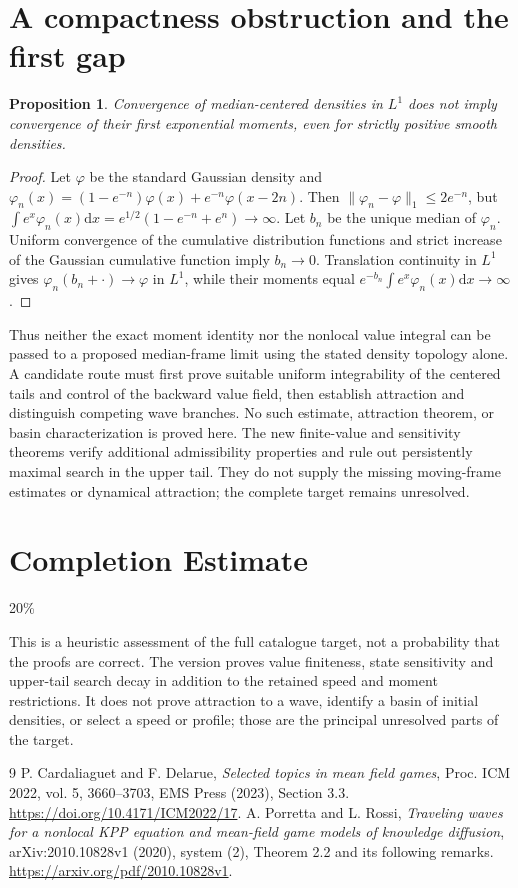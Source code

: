\documentclass[11pt]{article}
\newtheorem{proposition}[theorem]{Proposition}
\newcommand{\dd}{\mathrm d}
\begin{document}
\section{A compactness obstruction and the first gap}
\begin{proposition}
Convergence of median-centered densities in $L^1$ does not imply convergence of their first exponential moments, even for strictly positive smooth densities.
\end{proposition}
\begin{proof}
Let $\varphi$ be the standard Gaussian density and $\varphi_n(x)=(1-e^{-n})\varphi(x)+e^{-n}\varphi(x-2n)$. Then $\|\varphi_n-\varphi\|_1\le2e^{-n}$, but
$\int e^x\varphi_n(x)\dd x=e^{1/2}(1-e^{-n}+e^n)\to\infty$.
Let $b_n$ be the unique median of $\varphi_n$. Uniform convergence of the cumulative distribution functions and strict increase of the Gaussian cumulative function imply $b_n\to0$. Translation continuity in $L^1$ gives $\varphi_n(b_n+\cdot)\to\varphi$ in $L^1$, while their moments equal $e^{-b_n}\int e^x\varphi_n(x)\dd x\to\infty$.
\end{proof}
Thus neither the exact moment identity nor the nonlocal value integral can be passed to a proposed median-frame limit using the stated density topology alone. A candidate route must first prove suitable uniform integrability of the centered tails and control of the backward value field, then establish attraction and distinguish competing wave branches. No such estimate, attraction theorem, or basin characterization is proved here. The new finite-value and sensitivity theorems verify additional admissibility properties and rule out persistently maximal search in the upper tail. They do not supply the missing moving-frame estimates or dynamical attraction; the complete target remains unresolved.

\section{Completion Estimate}
20\%

This is a heuristic assessment of the full catalogue target, not a probability that the proofs are correct. The version proves value finiteness, state sensitivity and upper-tail search decay in addition to the retained speed and moment restrictions. It does not prove attraction to a wave, identify a basin of initial densities, or select a speed or profile; those are the principal unresolved parts of the target.

\begin{thebibliography}{9}
 P. Cardaliaguet and F. Delarue, \emph{Selected topics in mean field games}, Proc. ICM 2022, vol. 5, 3660--3703, EMS Press (2023), Section 3.3. \url{https://doi.org/10.4171/ICM2022/17}.
 A. Porretta and L. Rossi, \emph{Traveling waves for a nonlocal KPP equation and mean-field game models of knowledge diffusion}, arXiv:2010.10828v1 (2020), system (2), Theorem 2.2 and its following remarks. \url{https://arxiv.org/pdf/2010.10828v1}.
\end{thebibliography}
\end{document}
